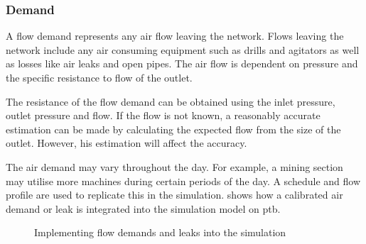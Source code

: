 		\subsubsection{Demand}
			A flow demand represents any air flow leaving the network. Flows leaving the network include any air consuming equipment such as drills and agitators as well as losses like air leaks and open pipes. The air flow is dependent on pressure and the specific resistance to flow of the outlet. 
			\par 
			The resistance of the flow demand can be obtained using the inlet pressure, outlet pressure and flow. If the flow is not known, a reasonably accurate estimation can be made by calculating the expected flow from the size of the outlet. However, his estimation will affect the accuracy.
			\par
			 The air demand may vary throughout the day. For example, a mining section may utilise more machines during certain periods of the day. A schedule and flow profile are used to replicate this in the simulation.  shows how a calibrated air demand or leak is integrated into the simulation model on \gls{ptb}.
			\begin{figure}[h]
				\centering
				\caption{Implementing flow demands and leaks into the simulation} 
				\label{fig: Demand component}
			\end{figure}
